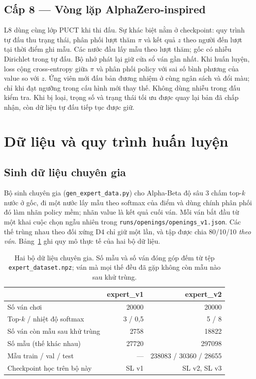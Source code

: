 \subsection{Cấp 8 --- Vòng lặp AlphaZero-inspired}
L8 dùng cùng lớp PUCT khi thi đấu. Sự khác biệt nằm ở checkpoint: quy trình tự đấu thu trạng thái, phân phối lượt thăm $\pi$ và kết quả $z$ theo người đến lượt tại thời điểm ghi mẫu. Các nước đầu lấy mẫu theo lượt thăm; gốc có nhiễu Dirichlet trong tự đấu. Bộ nhớ phát lại giữ cửa sổ ván gần nhất. Khi huấn luyện, loss cộng cross-entropy giữa $\pi$ và phân phối policy với sai số bình phương của value so với $z$. Ứng viên mới đấu bản đương nhiệm ở cùng ngân sách và đổi màu; chỉ khi đạt ngưỡng trong cấu hình mới thay thế. Không dùng nhiễu trong đấu kiểm tra. Khi bị loại, trọng số và trạng thái tối ưu được quay lại bản đã chấp nhận, còn dữ liệu tự đấu tiếp tục được giữ.

\section{Dữ liệu và quy trình huấn luyện}
\subsection{Sinh dữ liệu chuyên gia}
Bộ sinh chuyên gia (\texttt{gen\_expert\_data.py}) cho Alpha-Beta độ sâu 3 chấm top-$k$ nước ở gốc, đi một nước lấy mẫu theo softmax của điểm và dùng chính phân phối đó làm nhãn policy mềm; nhãn value là kết quả cuối ván. Mỗi ván bắt đầu từ một khai cuộc chọn ngẫu nhiên trong \texttt{runs/openings/openings\_v1.json}. Các thế trùng nhau theo đối xứng D4 chỉ giữ một lần, và tập được chia 80/10/10 \emph{theo ván}. Bảng~\ref{tab:du-lieu} ghi quy mô thực tế của hai bộ dữ liệu.

\begin{table}[H]
  \centering\small
  \caption{Hai bộ dữ liệu chuyên gia. Số mẫu và số ván đóng góp đếm từ tệp \texttt{expert\_dataset.npz}; ván mà mọi thế đều đã gặp không còn mẫu nào sau khử trùng.}
  \label{tab:du-lieu}
  \begin{tabular}{@{}lrr@{}}
    \toprule
    & expert\_v1 & expert\_v2 \\
    \midrule
    Số ván chơi & \num{20000} & \num{20000} \\
    Top-$k$ / nhiệt độ softmax & 3 / 0{,}5 & 5 / 8 \\
    Số ván còn mẫu sau khử trùng & \num{2758} & \num{18822} \\
    Số mẫu (thế khác nhau) & \num{27720} & \num{297098} \\
    Mẫu train / val / test & --- & \num{238083} / \num{30360} / \num{28655} \\
    Checkpoint học trên bộ này & SL v1 & SL v2, SL v3 \\
    \bottomrule
  \end{tabular}
\end{table}

